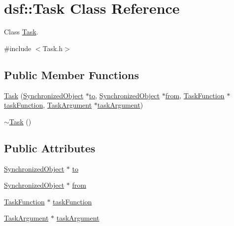 \hypertarget{classdsf_1_1_task}{}\section{dsf\+:\+:Task Class Reference}
\label{classdsf_1_1_task}


Class \hyperlink{classdsf_1_1_task}{Task}.  




{\ttfamily \#include $<$Task.\+h$>$}

\subsection*{Public Member Functions}
\begin{DoxyCompactItemize}
\item 
\hyperlink{classdsf_1_1_task_afa460a63f94f30df36df5661de1dbe1a}{Task} (\hyperlink{classdsf_1_1_synchronized_object}{Synchronized\+Object} $\ast$\hyperlink{classdsf_1_1_task_a36c485fbeb9c2330f5637b9d625cf01a}{to}, \hyperlink{classdsf_1_1_synchronized_object}{Synchronized\+Object} $\ast$\hyperlink{classdsf_1_1_task_afc1faf30dab0d57501dfdcb4ef7b5450}{from}, \hyperlink{namespacedsf_aa16e735f29587f4485b56fc46746f7a9}{Task\+Function} $\ast$\hyperlink{classdsf_1_1_task_a681617cab34fbae641c5b0cf4be46659}{task\+Function}, \hyperlink{namespacedsf_abe4bf68433935a81c31a5ada9b17663a}{Task\+Argument} $\ast$\hyperlink{classdsf_1_1_task_a8a095d8a36668f6500d4df8c24dbef8d}{task\+Argument})
\item 
\hyperlink{classdsf_1_1_task_a617ffc1b2f418f061fbc168d74ed5a55}{$\sim$\+Task} ()
\end{DoxyCompactItemize}
\subsection*{Public Attributes}
\begin{DoxyCompactItemize}
\item 
\hyperlink{classdsf_1_1_synchronized_object}{Synchronized\+Object} $\ast$ \hyperlink{classdsf_1_1_task_a36c485fbeb9c2330f5637b9d625cf01a}{to}
\item 
\hyperlink{classdsf_1_1_synchronized_object}{Synchronized\+Object} $\ast$ \hyperlink{classdsf_1_1_task_afc1faf30dab0d57501dfdcb4ef7b5450}{from}
\item 
\hyperlink{namespacedsf_aa16e735f29587f4485b56fc46746f7a9}{Task\+Function} $\ast$ \hyperlink{classdsf_1_1_task_a681617cab34fbae641c5b0cf4be46659}{task\+Function}
\item 
\hyperlink{namespacedsf_abe4bf68433935a81c31a5ada9b17663a}{Task\+Argument} $\ast$ \hyperlink{classdsf_1_1_task_a8a095d8a36668f6500d4df8c24dbef8d}{task\+Argument}
\end{DoxyCompactItemize}


